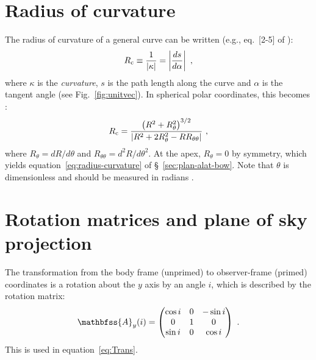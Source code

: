 
\section{Radius of curvature}
\label{sec:radius-curvature}

The radius of curvature of a general curve can be written (e.g.,
eq.~[2-5] of \citealp{Guggenheimer:2012a}):
\begin{equation}
  \label{eq:Rcurv-general}
  R_{\C} \equiv \frac{1}{\abs{\kappa}} = \Abs{\frac{d s}{d \alpha}} \ ,  
\end{equation}
where \(\kappa\) is the \textit{curvature}, \(s\) is the path length along
the curve and \(\alpha\) is the tangent angle (see Fig.~\ref{fig:unitvec}).
In spherical polar coordinates, this becomes \citep{Weisstein:2018a}:
\begin{equation}
  \label{eq:Rcurv-polar}
  R_{\mathrm{c}} = \frac{\left( R^2 + R_\theta^2 \right)^{3/2}}
  {\left\lvert R^2 + 2 R_\theta^2 - R R_{\theta\theta}\right\rvert} \ , 
\end{equation}
where \(R_\theta = d R / d \theta\) and
\(R_{\theta\theta} = d^2 R / d \theta^2\).  At the apex,
\(R_\theta = 0\) by symmetry, which yields
equation~\eqref{eq:radius-curvature} of
\S~\ref{sec:plan-alat-bow}. Note that \(\theta\) is dimensionless and
should be measured in radians \citep{Mohr:2015a, Quincey:2017a}.


\section{Rotation matrices and plane of sky projection}
\label{sec:plane-sky-projection}

The transformation from the body frame (unprimed) to observer-frame
(primed) coordinates is a rotation about the \(y\) axis by an angle
\(i\), which is described by the rotation matrix:
\begin{equation}
  \label{eq:Rotation-matrix-y}
  \mathbfss{A}_y(i) = 
   \begin{pmatrix}
    \cos i & 0 & -\sin i \\
    0 & 1 & 0 \\
    \sin i & 0 &\cos i 
  \end{pmatrix} \ .
\end{equation}
This is used in equation~\eqref{eq:Trans}.

